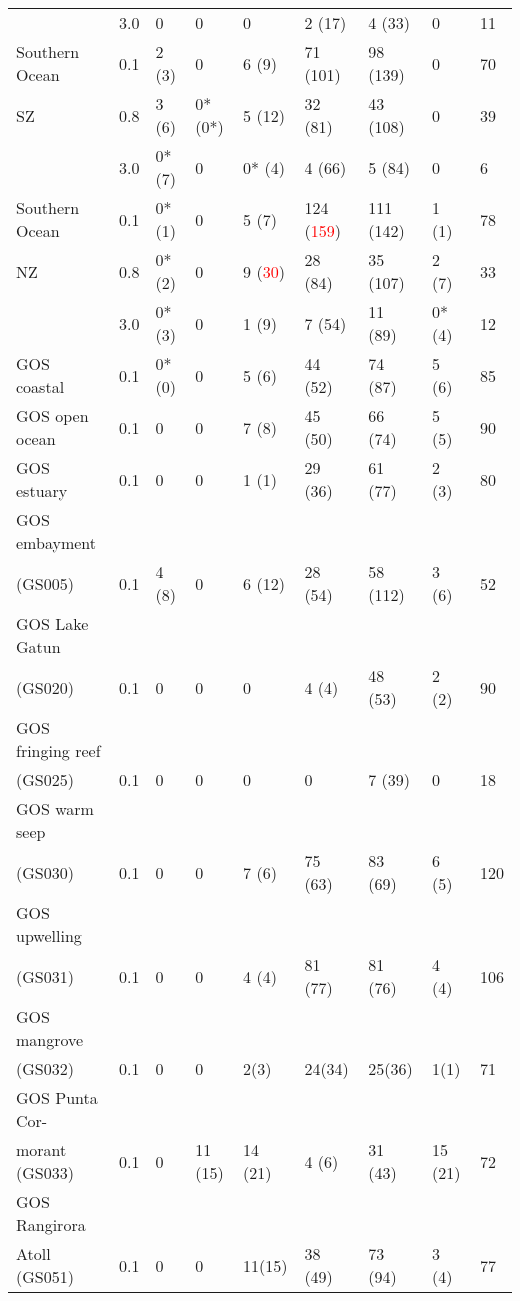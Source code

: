 \begin{longtable}{p{2.8cm}p{0.5cm}p{1.2cm}p{1cm}p{1cm}p{1.4cm}p{1.4cm}p{1.2cm}p{0.5cm}}
                               & 3.0 & 0        & 0       & 0       & 2 (17)    & 4 (33)    & 0       & 11 \\
Southern Ocean                 & 0.1 & 2 (3)    & 0       & 6 (9)   & 71 (101)  & 98 (139)  & 0       & 70 \\
SZ                             & 0.8 & 3 (6)    & 0* (0*) & 5 (12)  & 32 (81)   & 43 (108)  & 0       & 39 \\
                               & 3.0 & 0* (7)   & 0       & 0* (4)  & 4 (66)    & 5 (84)    & 0       & 6 \\
Southern Ocean                 & 0.1 & 0* (1)   & 0       & 5 (7)   & \cellcolor{blue!25}124 (\textcolor{red}{159}) & \cellcolor{blue!25}111 (142) & 1 (1)   & 78 \\
NZ                             & 0.8 & 0* (2)   & 0       & 9 (\textcolor{red}{30})  & 28 (84)   & 35 (107)  & 2 (7)   & 33 \\
                               & 3.0 & 0* (3)   & 0       & 1 (9)   & 7 (54)    & 11 (89)   & 0* (4)  & 12 \\
GOS coastal                    & 0.1 & 0* (0)   & 0       & 5 (6)   & 44 (52)   & 74 (87)   & 5 (6)   & 85 \\
GOS open ocean                 & 0.1 & 0        & 0       & 7 (8)   & 45 (50)   & 66 (74)   & 5 (5)   & 90 \\
GOS estuary                    & 0.1 & 0        & 0       & 1 (1)   & 29 (36)   & 61 (77)   & 2 (3)   & 80 \\
GOS embayment \\(GS005)        & 0.1 & 4 (8)    & 0       & 6 (12)  & 28 (54)   & 58 (112)  & 3 (6)   & 52 \\
GOS Lake Gatun \\(GS020)       & 0.1 & 0        & 0       & 0       & 4 (4)     & 48 (53)   & 2 (2)   & 90 \\
GOS fringing reef \\(GS025)    & 0.1 & 0        & 0       & 0       & 0         & 7 (39)    & 0       & 18 \\
GOS warm seep \\(GS030)        & 0.1 & 0        & 0       & 7 (6)   & 75 (63)   & 83 (69)   & 6 (5)   & 120 \\
GOS upwelling \\(GS031)        & 0.1 & 0        & 0       & 4 (4)   & 81 (77)   & 81 (76)   & 4 (4)   & 106 \\
GOS mangrove \\(GS032)         & 0.1 & 0        & 0       & 2(3)    & 24(34)    & 25(36)    & 1(1)    & 71 \\
GOS Punta Cor-\\morant (GS033) & 0.1 & 0        & \cellcolor{blue!25}11 (15) & \cellcolor{blue!25}14 (21) & 4 (6)     & 31 (43)   & 15 (21) & 72 \\
GOS Rangirora \\Atoll (GS051)  & 0.1 & 0        & 0       & 11(15)  & 38 (49)   & 73 (94)   & 3 (4)   & 77 \\
\end{longtable}
\endgroup

